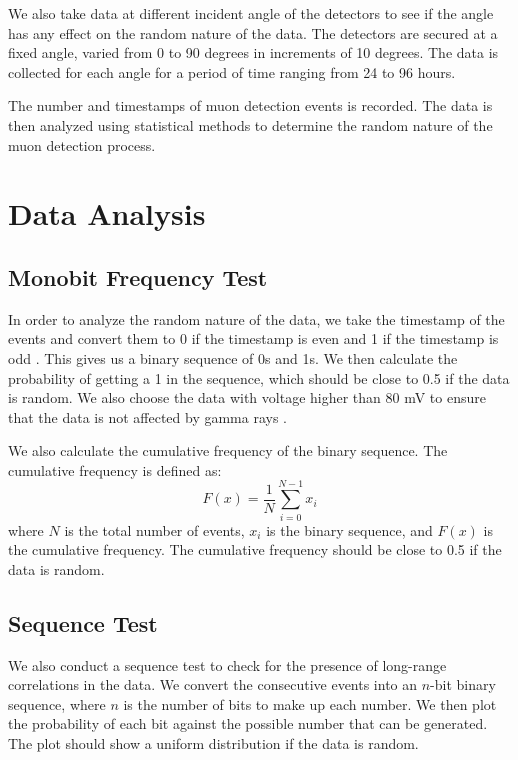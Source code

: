 We also take data at different incident angle of the detectors to see if the angle has any effect on the random nature of the data. The detectors are secured at a fixed angle, varied from 0 to 90 degrees in increments of 10 degrees. The data is collected for each angle for a period of time ranging from 24 to 96 hours. 

The number and timestamps of muon detection events is recorded. The data is then analyzed using statistical methods to determine the random nature of the muon detection process.

\section{Data Analysis}

\subsection{Monobit Frequency Test}
In order to analyze the random nature of the data, we take the timestamp of the events and convert them to 0 if the timestamp is even and 1 if the timestamp is odd \cite{axani2024cosmicwatch}. This gives us a binary sequence of 0s and 1s. We then calculate the probability of getting a 1 in the sequence, which should be close to 0.5 if the data is random. We also choose the data with voltage higher than 80 mV to ensure that the data is not affected by gamma rays \cite{axani2024cosmicwatch}. 

We also calculate the cumulative frequency of the binary sequence. The cumulative frequency is defined as:
\begin{equation}
F(x) = \frac{1}{N} \sum_{i=0}^{N-1} x_i
\end{equation}
where $N$ is the total number of events, $x_i$ is the binary sequence, and $F(x)$ is the cumulative frequency. The cumulative frequency should be close to 0.5 if the data is random.

\subsection{Sequence Test}
We also conduct a sequence test to check for the presence of long-range correlations in the data. We convert the consecutive events into an $n$-bit binary sequence, where $n$ is the number of bits to make up each number. We then plot the probability of each bit against the possible number that can be generated. The plot should show a uniform distribution if the data is random. 

